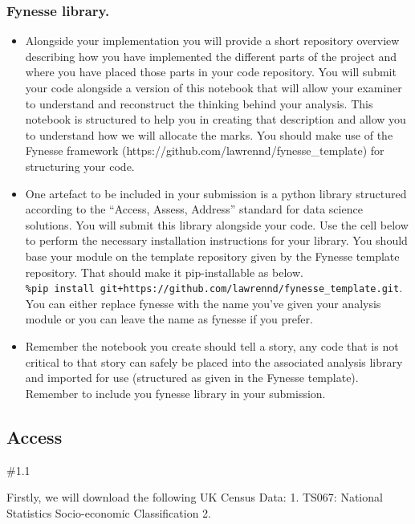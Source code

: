 \documentclass[11pt]{article}
\begin{document}
    \subsubsection{Fynesse library.}\label{fynesse-library.}

\begin{itemize}
\item
  Alongside your implementation you will provide a short repository
  overview describing how you have implemented the different parts of
  the project and where you have placed those parts in your code
  repository. You will submit your code alongside a version of this
  notebook that will allow your examiner to understand and reconstruct
  the thinking behind your analysis. This notebook is structured to help
  you in creating that description and allow you to understand how we
  will allocate the marks. You should make use of the Fynesse framework
  (https://github.com/lawrennd/fynesse\_template) for structuring your
  code.
\item
  One artefact to be included in your submission is a python library
  structured according to the ``Access, Assess, Address'' standard for
  data science solutions. You will submit this library alongside your
  code. Use the cell below to perform the necessary installation
  instructions for your library. You should base your module on the
  template repository given by the Fynesse template repository. That
  should make it pip-installable as below.
  \texttt{\%pip\ install\ git+https://github.com/lawrennd/fynesse\_template.git}.
  You can either replace fynesse with the name you've given your
  analysis module or you can leave the name as fynesse if you prefer.
\item
  Remember the notebook you create should tell a story, any code that is
  not critical to that story can safely be placed into the associated
  analysis library and imported for use (structured as given in the
  Fynesse template). Remember to include you fynesse library in your
  submission.
\end{itemize}

    \subsection{Access}\label{access}

    \#1.1

Firstly, we will download the following UK Census Data: 1. TS067:
National Statistics Socio-economic Classification 2.
\end{document}
